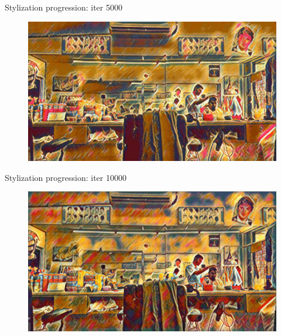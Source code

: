 \documentclass{beamer}
\begin{document}
    \begin{frame}{Stylization progression: iter 5000}

        \begin{figure}
            \includegraphics[width=\textwidth]{progression-3}
        \end{figure}

    \end{frame}

    \begin{frame}{Stylization progression: iter 10000}

        \begin{figure}
            \includegraphics[width=\textwidth]{progression-4}
        \end{figure}

    \end{frame}
\end{document}
